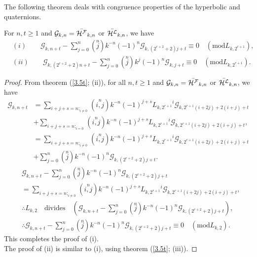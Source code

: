 \noindent The following theorem deals with congruence properties of the hyperbolic \kF\vspace{.5mm} and \kL\vspace{.5mm} quaternions. 
\begin{theorem}For $n, t\geq 1$ and $\mathcal{G}_{k,n}=\bar{{\mathcal{H^F}}}_{k,n}$ or $\bar{{\mathcal{H^L}}}_{k,n}$, we have\label{3.12t}
\begin{align*}
&(i)\qquad\mathcal{G}_{k,n+t}-\sum\limits_{j=0}^{n}\left( \stackrel{n}{j}\right) k^{-n}(-1)^{n}\mathcal{G}_{k,(2^{r+2}+2)j+t} \equiv 0\quad (\text{mod} {L_{k,2^{r+1}}}),\\
&(ii)\qquad\mathcal{G}_{k,(2^{r+2}+2)n+t}-\sum\limits_{j=0}^{n}\left( \stackrel{n}{j}\right) k^{j}(-1)^{n}\mathcal{G}_{k,j+t}\equiv 0\quad (\text{mod} L_{k,2^{r+1}}).
\end{align*}
\end{theorem}
\begin{proof}
From theorem (\ref{3.5t}; (ii)), for all $n, t\geq 1$ and $\mathcal{G}_{k,n}=\bar{{\mathcal{H^F}}}_{k,n}$ or $\bar{{\mathcal{H^L}}}_{k,n}$, we have
\begin{align*}
\mathcal{G}_{k,n+t}&=\sum\limits_{{i+j+s=n};_{i\neq 0}}\left( \stackrel{n}{i,j}\right) k^{-n}(-1)^{j+s}{{L}_{k,2^{r+1}}}^i\mathcal{G}_{k,2^{r+1}(i+2j)+2(i+j)+t}\\&+\sum\limits_{{i+j+s=n};_{i= 0}}\left( \stackrel{n}{i,j}\right) k^{-n}(-1)^{j+s}{{L}_{k,2^{r+1}}}^i\mathcal{G}_{k,2^{r+1}(i+2j)+2(i+j)+t},\\
&=\sum\limits_{{i+j+s=n};_{i\neq 0}}\left( \stackrel{n}{i,j}\right) k^{-n}(-1)^{j+s}{{L}_{k,2^{r+1}}}^i\mathcal{G}_{k,2^{r+1}(i+2j)+2(i+j)+t}\\&+\sum\limits_{j=0}^{n}\left( \stackrel{n}{j}\right) k^{-n}(-1)^{n}\mathcal{G}_{k,(2^{r+2}+2)j+t}.
\end{align*}
\begin{align*}
&\mathcal{G}_{k,n+t}-\sum\limits_{j=0}^{n}\left( \stackrel{n}{j}\right) k^{-n}(-1)^{n}\mathcal{G}_{k,(2^{r+2}+2)j+t}\\&=\sum\limits_{{i+j+s=n};_{i\neq 0}}\left( \stackrel{n}{i,j}\right) k^{-n}(-1)^{j+s}{{L}_{k,2^{r+1}}}^i\mathcal{G}_{k,2^{r+1}(i+2j)+2(i+j)+t},\\
&\therefore {L}_{k,2} \quad\text{divides}\quad(\mathcal{G}_{k,n+t}-\sum\limits_{j=0}^{n}\left( \stackrel{n}{j}\right) k^{-n}(-1)^{n}\mathcal{G}_{k,(2^{r+2}+2)j+t}),\\
&\therefore\mathcal{G}_{k,n+t}-\sum\limits_{j=0}^{n}\left( \stackrel{n}{j}\right) k^{-n}(-1)^{n}\mathcal{G}_{k,(2^{r+2}+2)j+t}\equiv 0\quad (\text{mod} {L}_{k,2}).
\end{align*}
This completes the proof of (i).\\
\noindent The proof of (ii) is similar to (i), using theorem (\ref{3.5t}; (iii)).
\end{proof} 
